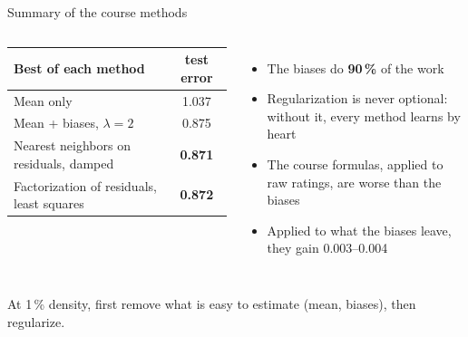 \documentclass[aspectratio=169,11pt]{beamer}
\newcommand{\key}[1]{\textcolor{accent}{\textbf{#1}}}
\newcommand{\takeaway}[1]{\vfill\begin{center}\colorbox{accent!8}{\parbox{0.9\textwidth}{\centering #1}}\end{center}}
\begin{document}
\begin{frame}{Summary of the course methods}
\begin{columns}[c]
\footnotesize
\begin{tabular}{@{}lc@{}}
\toprule
\textbf{Best of each method} & \textbf{test error} \\
\midrule
Mean only & 1.037 \\
Mean + biases, $\lambda = 2$ & 0.875 \\
Nearest neighbors on residuals, damped & \key{0.871} \\
Factorization of residuals, least squares & \key{0.872} \\
\bottomrule
\end{tabular}
\begin{itemize}\small
  \item The biases do \key{90\,\%} of the work
  \item Regularization is never optional: without it, every method learns by heart
  \item The course formulas, applied to raw ratings, are worse than the biases
  \item Applied to what the biases leave, they gain 0.003--0.004
\end{itemize}
\end{columns}
\takeaway{At 1\,\% density, first remove what is easy to estimate (mean, biases), then regularize.}
\end{frame}
\end{document}
